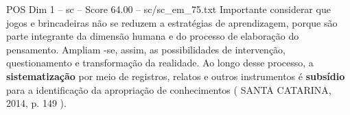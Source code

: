 \begin{textsample}{POS Dim 1 – sc – Score 64.00 – sc/sc\_em\_75.txt}
Importante considerar que jogos e brincadeiras não se reduzem a estratégias de aprendizagem, porque são parte integrante da dimensão humana e do processo de elaboração do pensamento.
Ampliam -se, assim, as possibilidades de intervenção, questionamento e transformação da realidade.
Ao longo desse processo, a \textbf{sistematização} por meio de registros, relatos e outros instrumentos é \textbf{subsídio} para a identificação da apropriação de conhecimentos ( SANTA CATARINA, 2014, p. 149 ).

\end{textsample}
